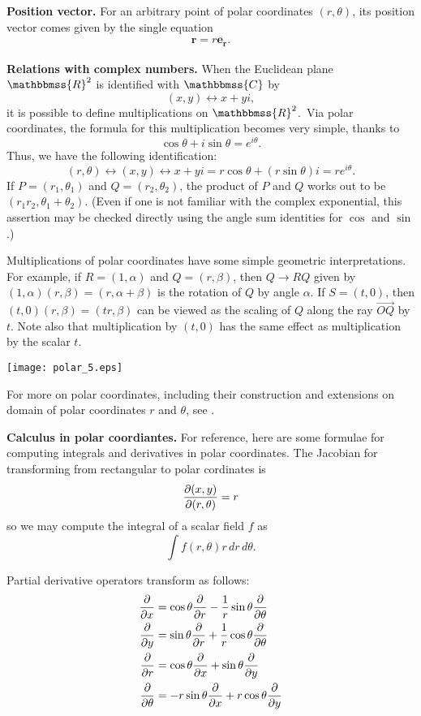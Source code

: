 \documentclass[12pt]{article}
\newcommand{\C}{\mathbbmss{C}}
\newcommand{\R}{\mathbbmss{R}}
\begin{document}
\textbf{Position vector.} For an arbitrary point of polar coordinates $(r,\theta)$, its position vector comes given by the single equation
\begin{align*}
\mathbf{r}=r\mathbf{e_r}.
\end{align*}

\textbf{Relations with complex numbers.}
When the Euclidean plane $\R^2$ is identified with $\C$ by
$$(x,y)\leftrightarrow x+yi,$$ it is possible to define multiplications on $\R^2$.\, Via polar coordinates, the formula for this multiplication becomes very simple, thanks to 
$$\cos{\theta}+i\sin{\theta}=e^{i\theta}.$$
Thus, we have the following identification:
$$(r,\theta)\leftrightarrow(x,y)\leftrightarrow x+yi=
r\cos{\theta}+(r\sin{\theta})i=re^{i\theta}.$$ If $P=(r_1,\theta_1)$
and $Q=(r_2,\theta_2)$, the product of $P$ and $Q$ works out to be
$(r_1r_2,\theta_1+\theta_2)$.
(Even if one is not familiar with the complex exponential, this assertion may be checked 
directly using the angle sum identities for $\cos$ and $\sin$.)

Multiplications of polar coordinates have some simple geometric
interpretations. For example, if $R=(1,\alpha)$ and $Q=(r,\beta)$,
then $Q\rightarrow RQ$ given by
$(1,\alpha)(r,\beta)=(r,\alpha+\beta)$ is the rotation of $Q$ by
angle $\alpha$. If $S=(t,0)$, then $(t,0)(r,\beta)=(tr,\beta)$ can
be viewed as the scaling of $Q$ along the ray $\overrightarrow{OQ}$
by $t$. Note also that multiplication by $(t,0)$ has the same effect
as multiplication by the scalar $t$.
\begin{center}
\texttt{[image: polar\_5.eps]}
\end{center}
For more on polar coordinates, including their construction and extensions on domain of polar coordinates $r$ and $\theta$, see .

\textbf{Calculus in polar coordiantes.}
For reference, here are some formulae for computing integrals and derivatives
in polar coordinates.  The Jacobian for transforming from rectangular to
polar cordinates is
\[
 {\partial (x, y) \over \partial (r, \theta)} = r 
\]
so we may compute the integral of a scalar field $f$ as
\[
 \int f (r, \theta) r \, dr \, d\theta .
\]

Partial derivative operators transform as follows:
\begin{align*}
 {\partial \over \partial x} &= \cos \theta {\partial \over \partial r} -
                                {1 \over r} \sin \theta {\partial \over \partial \theta} \\
 {\partial \over \partial y} &= \sin \theta {\partial \over \partial r} + 
                                {1 \over r} \cos \theta {\partial \over \partial \theta} \\
 {\partial \over \partial r} &= \cos \theta {\partial \over \partial x} +
                                \sin \theta {\partial \over \partial y} \\
 {\partial \over \partial \theta} &= - r \sin \theta {\partial \over \partial x} +
                                     r \cos \theta {\partial \over \partial y}
\end{align*}
 
\end{document}
